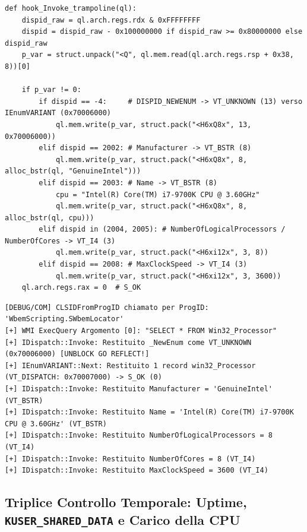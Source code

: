 \documentclass[11pt, a4paper]{article}
\begin{document}
\begin{lstlisting}[style=pythoncode, caption={Costruzione delle VTable binarie IDispatch/IEnumVARIANT e spoofing WMI della CPU Intel Core i7-9700K.}, label={lst:gorat_wmi}]
def hook_Invoke_trampoline(ql):
    dispid_raw = ql.arch.regs.rdx & 0xFFFFFFFF
    dispid = dispid_raw - 0x100000000 if dispid_raw >= 0x80000000 else dispid_raw
    p_var = struct.unpack("<Q", ql.mem.read(ql.arch.regs.rsp + 0x38, 8))[0]

    if p_var != 0:
        if dispid == -4:     # DISPID_NEWENUM -> VT_UNKNOWN (13) verso IEnumVARIANT (0x70006000)
            ql.mem.write(p_var, struct.pack("<H6xQ8x", 13, 0x70006000))
        elif dispid == 2002: # Manufacturer -> VT_BSTR (8)
            ql.mem.write(p_var, struct.pack("<H6xQ8x", 8, alloc_bstr(ql, "GenuineIntel")))
        elif dispid == 2003: # Name -> VT_BSTR (8)
            cpu = "Intel(R) Core(TM) i7-9700K CPU @ 3.60GHz"
            ql.mem.write(p_var, struct.pack("<H6xQ8x", 8, alloc_bstr(ql, cpu)))
        elif dispid in (2004, 2005): # NumberOfLogicalProcessors / NumberOfCores -> VT_I4 (3)
            ql.mem.write(p_var, struct.pack("<H6xi12x", 3, 8))
        elif dispid == 2008: # MaxClockSpeed -> VT_I4 (3)
            ql.mem.write(p_var, struct.pack("<H6xi12x", 3, 3600))
    ql.arch.regs.rax = 0  # S_OK
\end{lstlisting}


\noindent\begin{minipage}{\linewidth}
\begin{lstlisting}[style=consoleout, caption={Log dell'interrogazione COM/WMI intercettata e dei parametri hardware restituiti al malware.}, label={lst:gorat_wmi_out}]
[DEBUG/COM] CLSIDFromProgID chiamato per ProgID: 'WbemScripting.SWbemLocator'
[+] WMI ExecQuery Argomento [0]: "SELECT * FROM Win32_Processor"
[+] IDispatch::Invoke: Restituito _NewEnum come VT_UNKNOWN (0x70006000) [UNBLOCK GO REFLECT!]
[+] IEnumVARIANT::Next: Restituito 1 record win32_Processor (VT_DISPATCH: 0x70007000) -> S_OK (0)
[+] IDispatch::Invoke: Restituito Manufacturer = 'GenuineIntel' (VT_BSTR)
[+] IDispatch::Invoke: Restituito Name = 'Intel(R) Core(TM) i7-9700K CPU @ 3.60GHz' (VT_BSTR)
[+] IDispatch::Invoke: Restituito NumberOfLogicalProcessors = 8 (VT_I4)
[+] IDispatch::Invoke: Restituito NumberOfCores = 8 (VT_I4)
[+] IDispatch::Invoke: Restituito MaxClockSpeed = 3600 (VT_I4)
\end{lstlisting}
\end{minipage}


\subsection{Triplice Controllo Temporale: Uptime, \texttt{KUSER\_SHARED\_DATA} e Carico della CPU}
\end{document}
